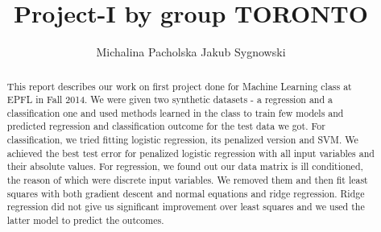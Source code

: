 \documentclass{article}
\title{Project-I by group TORONTO}
\author{Michalina Pacholska \And Jakub Sygnowski}
\begin{document}
\maketitle
\begin{abstract}
This report describes our work on first project done for Machine Learning class at EPFL in Fall 2014. We were given two synthetic datasets - a regression and a classification one and used methods learned in the class to train few models and predicted regression and classification outcome for the test data we got. For classification, we tried fitting logistic regression, its penalized version and SVM. We achieved the best test error for penalized logistic regression with all input variables and their absolute values. For regression, we found out our data matrix is ill conditioned, the reason of which were discrete input variables. We removed them and then fit least squares with both gradient descent and normal equations and ridge regression. Ridge regression did not give us significant improvement over least squares and we used the latter model to predict the outcomes.
\end{abstract}
\end{document}
